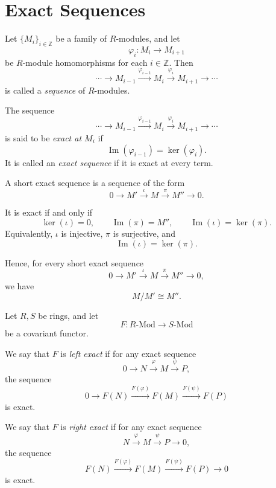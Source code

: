 \section{Exact Sequences}

\begin{definition}
    Let $\{M_i\}_{i\in \mathbb Z}$ be a family of $R$-modules, and let
    \[
        \varphi_i:M_i\to M_{i+1}
    \]
    be $R$-module homomorphisms for each $i\in\mathbb Z$. Then
    \[
        \cdots \longrightarrow M_{i-1}\xrightarrow{\varphi_{i-1}} M_i \xrightarrow{\varphi_i} M_{i+1}\longrightarrow \cdots
    \]
    is called a \emph{sequence} of $R$-modules.
\end{definition}

\begin{definition}
    The sequence
    \[
        \cdots \longrightarrow M_{i-1}\xrightarrow{\varphi_{i-1}} M_i \xrightarrow{\varphi_i} M_{i+1}\longrightarrow \cdots
    \]
    is said to be \emph{exact at $M_i$} if
    \[
        \operatorname{Im}(\varphi_{i-1})=\ker(\varphi_i).
    \]
    It is called an \emph{exact sequence} if it is exact at every term.
\end{definition}

A short exact sequence is a sequence of the form
\[
    0\longrightarrow M' \xrightarrow{\iota} M \xrightarrow{\pi} M'' \longrightarrow 0.
\]

It is exact if and only if
\[
    \ker(\iota)=0,
    \qquad
    \operatorname{Im}(\pi)=M'',
    \qquad
    \operatorname{Im}(\iota)=\ker(\pi).
\]
Equivalently, $\iota$ is injective, $\pi$ is surjective, and
\[
    \operatorname{Im}(\iota)=\ker(\pi).
\]

Hence, for every short exact sequence
\[
    0\longrightarrow M' \xrightarrow{\iota} M \xrightarrow{\pi} M'' \longrightarrow 0,
\]
we have
\[
    M/M' \cong M''.
\]

\begin{definition}
    Let $R,S$ be rings, and let
    \[
        F: R\text{-}\mathrm{Mod} \to S\text{-}\mathrm{Mod}
    \]
    be a covariant functor.

    We say that $F$ is \emph{left exact} if for any exact sequence
    \[
        0 \to N \xrightarrow{\varphi} M \xrightarrow{\psi} P,
    \]
    the sequence
    \[
        0 \to F(N) \xrightarrow{F(\varphi)} F(M) \xrightarrow{F(\psi)} F(P)
    \]
    is exact.

    We say that $F$ is \emph{right exact} if for any exact sequence
    \[
        N \xrightarrow{\varphi} M \xrightarrow{\psi} P \to 0,
    \]
    the sequence
    \[
        F(N) \xrightarrow{F(\varphi)} F(M) \xrightarrow{F(\psi)} F(P) \to 0
    \]
    is exact.
\end{definition}

